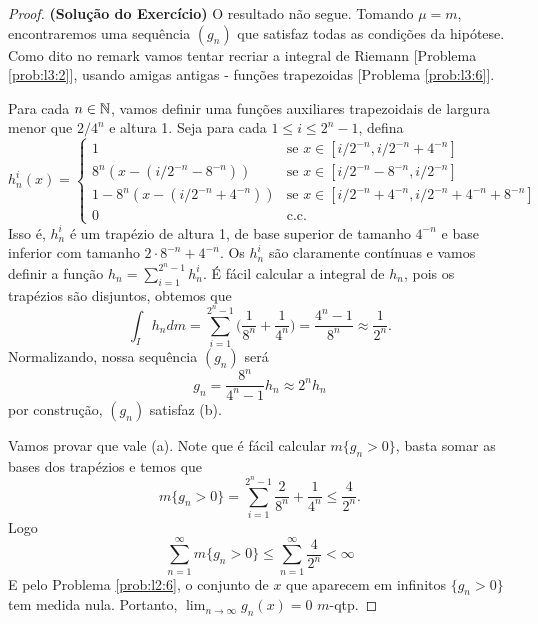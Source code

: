 \begin{proof}
    \textbf{(Solução do Exercício)} O resultado não segue. Tomando $\mu = m$, encontraremos uma sequência $(g_n)$ que satisfaz todas as condições da hipótese.
    Como dito no remark vamos tentar recriar a integral de Riemann [Problema \ref{prob:l3:2}], usando amigas antigas - funções trapezoidas [Problema \ref{prob:l3:6}].
    
    Para cada $n \in \mathbb{N}$, vamos definir uma funções auxiliares trapezoidais de largura menor que $2/4^n$ e altura 1. Seja  para cada $1 \leq i \leq 2^n - 1$,
    defina
    $$h_n^i(x) = \begin{cases}
        1 & \text{se } x \in [i/2^{-n}, i/2^{-n} + 4^{-n}]\\
        8^n(x - (i/2^{-n} - 8^{-n})) &\text{se } x \in [i/2^{-n} - 8^{-n}, i/2^{-n}]\\
        1 - 8^n(x - (i/2^{-n} + 4^{-n})) &\text{se } x \in [i/2^{-n} + 4^{-n}, i/2^{-n} + 4^{-n} + 8^{-n}]\\
        0 & \text{c.c.}
    \end{cases}$$ 
    Isso é, $h_n^i$ é um trapézio de altura 1, de base superior de tamanho $4^{-n}$ e base inferior com tamanho $2 \cdot 8^{-n} + 4^{-n}$.
    Os $h_n^i$ são claramente contínuas e vamos definir a função $h_n = \sum_{i=1}^{2^n - 1} h_n^i$. É fácil calcular a integral de $h_n$, pois os trapézios são disjuntos,
    obtemos que 
    $$\int_I h_n dm = \sum_{i = 1}^{2^n - 1} \big(\frac{1}{8^n} + \frac{1}{4^n}\big) = \frac{4^n - 1}{8^n} \approx \frac{1}{2^n}.$$
    Normalizando, nossa sequência $(g_n)$ será 
    $$g_n = \frac{8^n}{4^n - 1}h_n \approx 2^n h_n$$
    por construção, $(g_n)$ satisfaz (b). 
    
    Vamos provar que vale (a). Note que é fácil calcular $m\{g_n > 0\}$, basta somar as bases dos trapézios 
    e temos que 
    $$m\{g_n > 0\} = \sum_{i = 1}^{2^n - 1} \frac{2}{8^n} + \frac{1}{4^n} \leq \frac{4}{2^n}.$$
    Logo
    $$\sum_{n = 1}^{\infty} m\{g_n > 0\} \leq \sum_{n=1}^{\infty} \frac{4}{2^n} < \infty$$
    E pelo Problema \ref{prob:l2:6}, o conjunto de $x$ que aparecem em infinitos $\{g_n > 0\}$ tem medida nula. Portanto, 
    $\lim_{n\to\infty} g_n(x) = 0$ $m$-qtp.


\end{proof}

